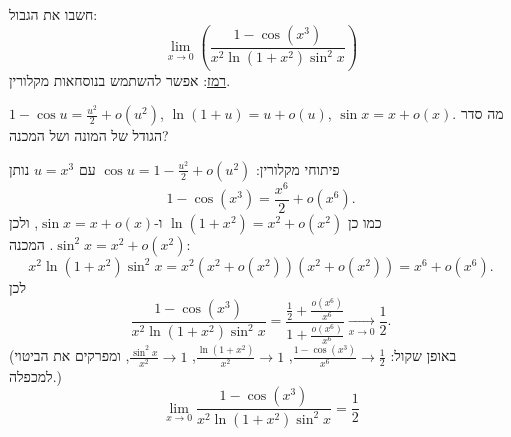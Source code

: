 
\begin{question}
חשבו את הגבול:
\[ \lim_{x\to0}\left(\frac{1-\cos(x^3)}{x^2\ln(1+x^2)\sin^2x}\right) \]
\underline{רמז}: אפשר להשתמש בנוסחאות מקלורין.
\end{question}

\begin{hint}
$1-\cos u=\frac{u^2}{2}+o(u^2)$, $\ln(1+u)=u+o(u)$, $\sin x=x+o(x)$. מה סדר הגודל של המונה ושל המכנה?
\end{hint}

\begin{solution}
פיתוחי מקלורין: $\cos u=1-\frac{u^2}{2}+o(u^2)$ עם $u=x^3$ נותן
\[ 1-\cos(x^3)=\frac{x^6}{2}+o(x^6). \]
כמו כן $\ln(1+x^2)=x^2+o(x^2)$ ו-$\sin x=x+o(x)$, ולכן $\sin^2x=x^2+o(x^2)$. המכנה:
\[ x^2\ln(1+x^2)\sin^2x=x^2\left(x^2+o(x^2)\right)\left(x^2+o(x^2)\right)=x^6+o(x^6). \]
לכן
\[ \frac{1-\cos(x^3)}{x^2\ln(1+x^2)\sin^2x}=\frac{\frac12+\frac{o(x^6)}{x^6}}{1+\frac{o(x^6)}{x^6}}\xrightarrow[x\to0]{}\frac12. \]
(באופן שקול: $\frac{1-\cos(x^3)}{x^6}\to\frac12$, $\frac{\ln(1+x^2)}{x^2}\to1$, $\frac{\sin^2x}{x^2}\to1$, ומפרקים את הביטוי למכפלה.)
\[ \boxed{\lim_{x\to0}\frac{1-\cos(x^3)}{x^2\ln(1+x^2)\sin^2x}=\frac12} \]
\end{solution}
